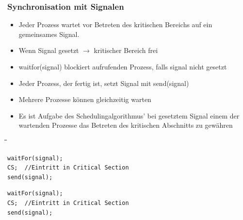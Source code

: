\subsubsection{Synchronisation mit Signalen}
\begin{itemize}
  \item Jeder Prozess wartet vor Betreten des kritischen Bereichs auf ein
        gemeinsames Signal.
  \item Wenn Signal gesetzt $\rightarrow$ kritischer Bereich frei
  \item waitfor(signal) blockiert aufrufenden Prozess, falls signal nicht
        gesetzt
  \item Jeder Prozess, der fertig ist, setzt Signal mit send(signal)
  \item Mehrere Prozesse können gleichzeitig warten
  \item Es ist Aufgabe des Schedulingalgorithmus' bei gesetztem Signal einem der wartenden Prozesse das Betreten des kritischen Abschnitts zu gewähren
\end{itemize}

\begin{tabbing}
  \hspace*{1cm}\=\hspace*{4.2cm}\=\hspace*{3cm}\=\hspace*{2.7cm}\= \kill
   \> \> \\
  \>\begin{lstlisting}[style=C]
waitFor(signal);
CS;  //Eintritt in Critical Section
send(signal);
    \end{lstlisting} \> \> \>
  \begin{lstlisting}[style=C]
waitFor(signal);
CS;  //Eintritt in Critical Section
send(signal);
    \end{lstlisting} \\\\
\end{tabbing}
\vspace*{-1.5cm}


